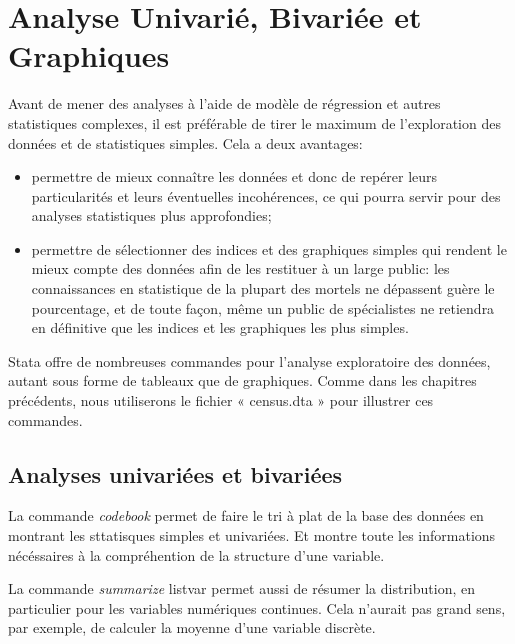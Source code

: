 \documentclass[
]{book}
\providecommand{\tightlist}{%
  \setlength{\itemsep}{0pt}\setlength{\parskip}{0pt}}
\begin{document}
\hypertarget{analyse-univariuxe9-bivariuxe9e-et-graphiques}{%
\chapter{Analyse Univarié, Bivariée et Graphiques}\label{analyse-univariuxe9-bivariuxe9e-et-graphiques}}

Avant de mener des analyses à l'aide de modèle de régression et
autres statistiques complexes, il est préférable de tirer le
maximum de l'exploration des données et de statistiques
simples. Cela a deux avantages:

\begin{itemize}
\tightlist
\item
  permettre de mieux connaître les données et donc de repérer
  leurs particularités et leurs éventuelles incohérences, ce qui
  pourra servir pour des analyses statistiques plus
  approfondies;
\item
  permettre de sélectionner des indices et des graphiques
  simples qui rendent le mieux compte des données afin de les
  restituer à un large public: les connaissances en statistique de
  la plupart des mortels ne dépassent guère le pourcentage, et
  de toute façon, même un public de spécialistes ne retiendra en
  définitive que les indices et les graphiques les plus simples.
\end{itemize}

Stata offre de nombreuses commandes pour l'analyse
exploratoire des données, autant sous forme de tableaux que de
graphiques. Comme dans les chapitres précédents, nous
utiliserons le fichier « census.dta » pour illustrer ces
commandes.

\hypertarget{analyses-univariuxe9es-et-bivariuxe9es}{%
\section{Analyses univariées et bivariées}\label{analyses-univariuxe9es-et-bivariuxe9es}}

La commande \emph{codebook} permet de faire le tri à plat de la base des données en montrant les sttatisques simples et univariées. Et montre toute les informations nécéssaires à la compréhention de la structure d'une variable.

La commande \emph{summarize} listvar permet aussi de résumer
la distribution, en particulier pour les variables numériques
continues. Cela n'aurait pas grand sens, par exemple, de calculer
la moyenne d'une variable discrète.
\end{document}
